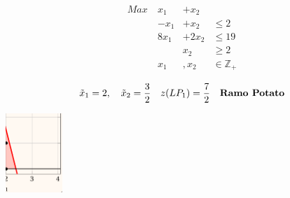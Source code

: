 {\[
 \begin{aligned}Max\ & x_1& +x_2 &\\& -x_1&+x_2 &\leq 2 \\& 8 x_1&+2x_2 &\leq 19 \\&& x_2 & \geqslant 2\\& x_1&, x_2 & \in \mathbb{Z}_{+}\end{aligned} 
\]

$$
\tilde{x}_1=2, \quad \tilde{x}_2=\frac{3}{2} \quad z(LP_1)=\frac{7}{2} \quad \text{\textbf{Ramo Potato}}
$$
\begin{center}
    \includegraphics[height=3cm]{bb3}
\end{center}

}
